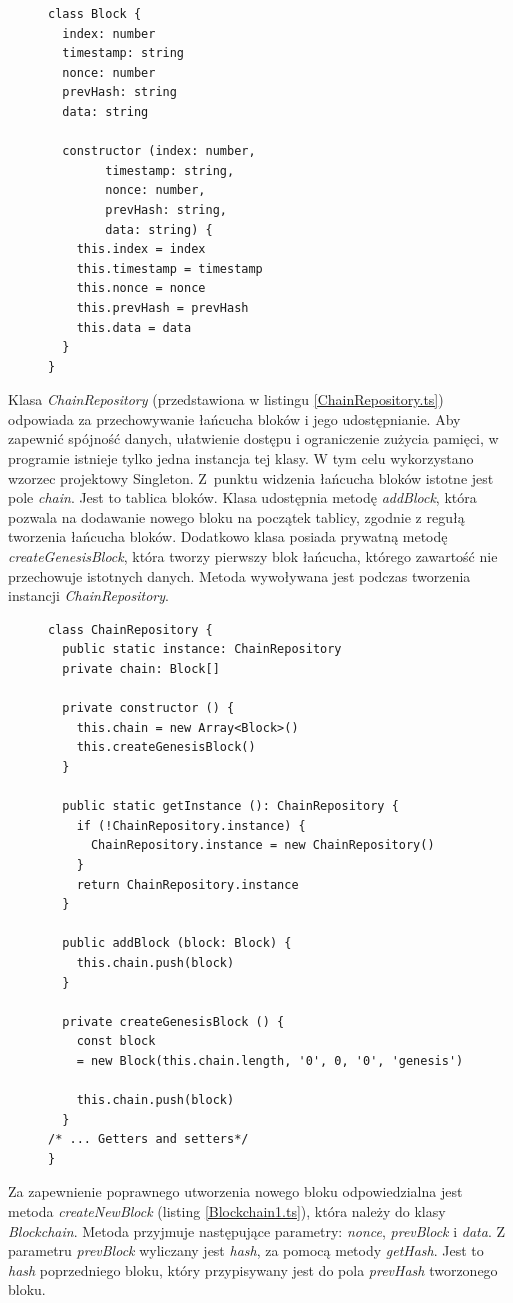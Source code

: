 \documentclass[a4paper,12pt]{book}
\begin{document}
\newpage

\begin{figure}  
  \centering
\begin{lstlisting}[style=ES6, caption={Klasa \textit{Block}.},label={Block.ts}]
class Block {
  index: number
  timestamp: string
  nonce: number
  prevHash: string
  data: string

  constructor (index: number,
 		timestamp: string,
 		nonce: number,
 		prevHash: string,
	 	data: string) {
    this.index = index
    this.timestamp = timestamp
    this.nonce = nonce
    this.prevHash = prevHash
    this.data = data
  }
}
\end{lstlisting}
\end{figure}
Klasa \textit{ChainRepository} (przedstawiona w listingu \ref{ChainRepository.ts}) odpowiada za przechowywanie łańcucha bloków i jego udostępnianie. Aby zapewnić spójność danych, ułatwienie dostępu i ograniczenie zużycia pamięci, w programie istnieje tylko jedna instancja tej klasy. W tym celu wykorzystano wzorzec projektowy Singleton. Z~punktu widzenia łańcucha bloków istotne jest pole \textit{chain}. Jest to tablica bloków. Klasa udostępnia metodę \textit{addBlock}, która pozwala na dodawanie nowego bloku na początek tablicy, zgodnie z regułą tworzenia łańcucha bloków. Dodatkowo klasa posiada prywatną metodę \textit{createGenesisBlock}, która tworzy pierwszy blok łańcucha, którego zawartość nie przechowuje istotnych danych. Metoda wywoływana jest podczas tworzenia instancji \textit{ChainRepository}.

\newpage

\begin{figure}  
  \centering
\begin{lstlisting}[style=ES6, caption={Klasa \textit{ChainRepository}.}, label={ChainRepository.ts}]
class ChainRepository {
  public static instance: ChainRepository
  private chain: Block[]

  private constructor () {
    this.chain = new Array<Block>()
    this.createGenesisBlock()
  }

  public static getInstance (): ChainRepository {
    if (!ChainRepository.instance) {
      ChainRepository.instance = new ChainRepository()
    }
    return ChainRepository.instance
  }

  public addBlock (block: Block) {
    this.chain.push(block)
  }

  private createGenesisBlock () {
    const block 
	= new Block(this.chain.length, '0', 0, '0', 'genesis')

    this.chain.push(block)
  }
/* ... Getters and setters*/
}
\end{lstlisting}
\end{figure}
Za zapewnienie poprawnego utworzenia nowego bloku odpowiedzialna jest metoda \textit{createNewBlock} (listing \ref{Blockchain1.ts}), która należy do klasy \textit{Blockchain}. Metoda przyjmuje następujące parametry: \textit{nonce}, \textit{prevBlock} i \textit{data}. Z parametru \textit{prevBlock} wyliczany jest \textit{hash}, za pomocą metody \textit{getHash}. Jest to \textit{hash} poprzedniego bloku, który przypisywany jest do pola \textit{prevHash} tworzonego bloku.
\end{document}

